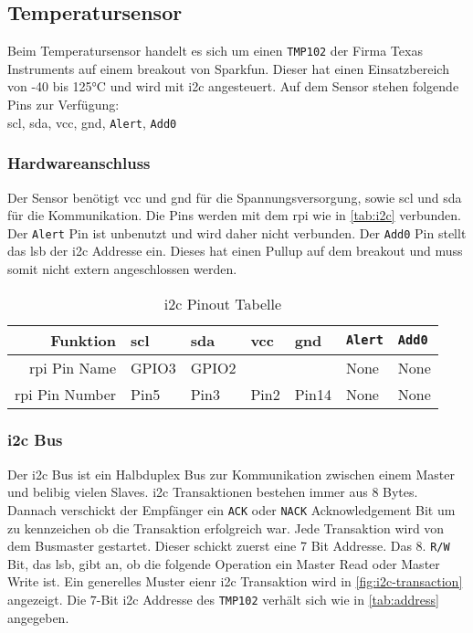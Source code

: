\subsection{Temperatursensor}

Beim Temperatursensor handelt es sich um einen \texttt{TMP102} der Firma Texas Instruments auf einem \gls{breakout} von Sparkfun.
Dieser hat einen Einsatzbereich von -40 bis 125°C und wird mit \gls{i2c} angesteuert.
Auf dem Sensor stehen folgende Pins zur Verfügung: \\
\gls{scl}, \gls{sda}, \gls{vcc}, \gls{gnd}, \texttt{Alert}, \texttt{Add0}

\subsubsection{Hardwareanschluss}

Der Sensor benötigt \gls{vcc} und \gls{gnd} für die Spannungsversorgung, sowie \gls{scl} und \gls{sda} für die Kommunikation.
Die Pins werden mit dem \gls{rpi} wie in \autoref{tab:i2c} verbunden.
Der \texttt{Alert} Pin ist unbenutzt und wird daher nicht verbunden.
Der \texttt{Add0} Pin stellt das \gls{lsb} der \gls{i2c} Addresse ein.
Dieses hat einen Pullup auf dem \gls{breakout} und muss somit nicht extern angeschlossen werden.

\begin{table}[h]
    \centering
    \begin{tabular}{|r||l|l|l|l|l|l|}
        \hline
        \textbf{Funktion} & \textbf{\gls{scl}} & \textbf{\gls{sda}} & \textbf{\gls{vcc}} & \textbf{\gls{gnd}} & \textbf{\texttt{Alert}} & \textbf{\texttt{Add0}}\\
        \hline
        \hline
        \gls{rpi} Pin Name & GPIO3 & GPIO2 & & & None & None \\
        \hline
        \gls{rpi} Pin Number & Pin5 & Pin3 & Pin2 & Pin14 & None & None \\
        \hline
    \end{tabular}
    \caption{\gls{i2c} Pinout Tabelle}
    \label{tab:i2c}
\end{table}

\subsubsection{\acrshort{i2c} Bus}

Der \gls{i2c} Bus ist ein Halbduplex Bus zur Kommunikation zwischen einem Master und belibig vielen Slaves.
\gls{i2c} Transaktionen bestehen immer aus 8 Bytes.
Dannach verschickt der Empfänger ein \texttt{ACK} oder \texttt{NACK} Acknowledgement Bit um zu kennzeichen ob die Transaktion erfolgreich war.
Jede Transaktion wird von dem Busmaster gestartet.
Dieser schickt zuerst eine 7 Bit Addresse. Das 8. \texttt{R/W} Bit, das \gls{lsb}, gibt an, ob die folgende Operation ein Master Read oder Master Write ist.
Ein generelles Muster eienr \gls{i2c} Transaktion wird in \autoref{fig:i2c-transaction} angezeigt.
Die $7$-Bit \gls{i2c} Addresse des \texttt{TMP102} verhält sich wie in \autoref{tab:address} angegeben.

